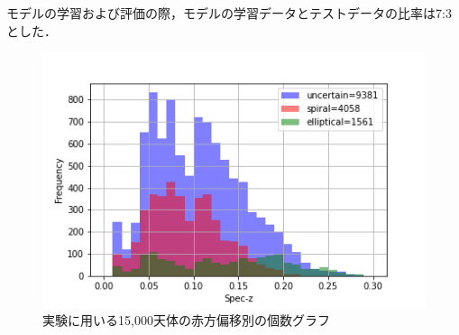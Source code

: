 \documentclass[a4j, 11pt]{jreport}
\begin{document}
モデルの学習および評価の際，モデルの学習データとテストデータの比率は7:3とした．

\begin{figure}[h]
 \centering
 \includegraphics[width=14cm]{images/z_15000_4.png}
 \caption{実験に用いる15,000天体の赤方偏移別の個数グラフ}
 \label{fig:z_15000}
\end{figure}
\end{document}
